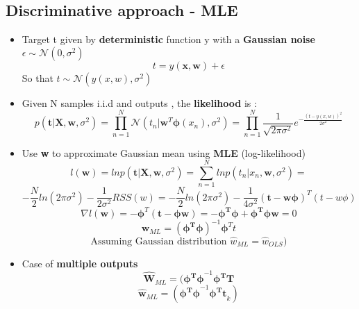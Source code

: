 \documentclass[12pt]{article} %
\begin{document}
\subsection{Discriminative approach - MLE}
\begin{itemize}
\item Target t given by \textbf{deterministic} function y with a \textbf{Gaussian noise} $ \epsilon \sim \mathcal{N}(0,\sigma^2)$
$$ t= y(\bm{x,w}) + \epsilon$$
So that $t \sim \mathcal{N}(y(x,w), \sigma^2)$

\item Given N samples i.i.d  and outputs , the \textbf{likelihood} is :
$$ p(\bm{t} | \bm{X,w},\sigma^2) = \prod \limits_{n=1}^N \mathcal{N}(t_n| \bm{w}^T \bm{\phi}(x_n),\sigma^2 ) = \prod \limits_{n=1}^N \frac{1}{\sqrt{2 \pi \sigma^2}}e^{- \frac{(t-y(x,w))^2}{2\sigma^2}}$$

\item Use  \textbf{w} to approximate Gaussian mean using \textbf{MLE} (log-likelihood)
 $$ l(\bm{w}) = ln p(\bm{t}| \bm{X,w},\sigma^2) = \sum \limits_{n=1}^N ln p(t_n | x_n , \bm{w} , \sigma^2)=$$
 $$ -\frac{N}{2}ln(2\pi \sigma^2) - \frac{1}{2\sigma^2}RSS(w) = -\frac{N}{2}ln(2\pi \sigma^2)- \frac{1}{4\sigma^2}(\bm{t-w \phi})^T(t-w\phi)$$
$$ \nabla l(\bm{w})= -\bm{\phi}^T (\bm{t- \phi w})=  -\bm{\phi^T \phi} + \bm{\phi^T \phi w}= 0$$
$$ \bm{w}_{ML} = (\bm{\phi^T \phi})^{-1} \bm{\phi}^T t$$
$$\text{Assuming Gaussian distribution } \hat{w}_{ML} = \hat{w}_{OLS})$$

\item Case of \textbf{multiple outputs} 
$$ \hat{\bm{W}}_{ML} = (\bm{\phi^T \phi}^{-1} \bm{\phi^T T}$$
$$ \hat{\bm{w}}_{ML} = (\bm{\phi^T \phi}^{-1} \bm{\phi^T t}_k)$$
\end{itemize}
\end{document}
